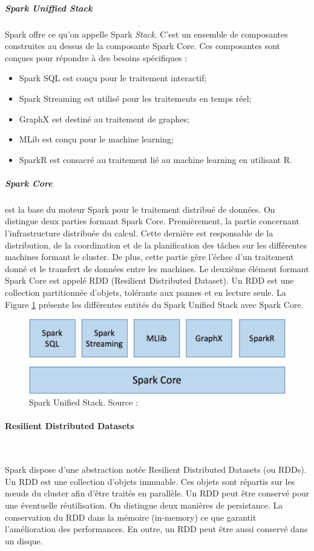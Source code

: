 \subparagraph{Spark Uniffied Stack} \label{Spark Uniffied-Stack}Spark offre ce qu'on appelle Spark \textit{Stack}. C'est un ensemble de composantes construites au dessus de la composante Spark Core.  Ces composantes sont conçues pour répondre à des besoins spécifiques :
\begin{itemize}
	\item Spark SQL  est conçu pour le traitement interactif;
	\item Spark Streaming est utilisé pour les traitements en temps réel;
	\item  GraphX est destiné au traitement de graphes;
	\item MLib est conçu pour le machine learning;
	\item SparkR est consacré au traitement lié au machine learning en utilisant  R.
\end{itemize}
\subparagraph{Spark Core} est la base du moteur Spark pour le traitement distribué de données.  On distingue deux parties formant Spark Core. Premièrement, la partie concernant l'infrastructure distribuée du calcul. Cette dernière est responsable de la distribution, de la coordination et de la planification des tâches  sur les différentes machines formant le cluster. De plus, cette partie gère l'échec d'un traitement donné et le transfert de données entre les machines. Le deuxième élément formant Spark Core est appelé RDD (Resilient Distributed Dataset). Un RDD est une collection partitionnée d'objets, tolérante aux pannes et en lecture seule. 
La Figure \ref{fig:unified-stack}  présente les différentes entités du Spark Unified Stack avec Spark Core.
\begin{figure}[H]
	\centering
	\captionsetup{justification=centering}
	\includegraphics[width=0.7\linewidth]{illustrations/unified-stack}
	\caption{ Spark Unified Stack. Source : \cite{eginning-Apache-Spark-2-unified-stack}}
	\label{fig:unified-stack}
\end{figure}

\paragraph{Resilient Distributed Datasets}~


Spark dispose d'une abstraction notée Resilient Distributed Datasets (ou RDDs). Un RDD est une collection d'objets immuable. Ces objets sont répartis sur les n\oe{}uds du cluster afin d'être traités en parallèle. Un RDD peut être conservé  pour une éventuelle réutilisation. On distingue deux manières de persistance. La conservation du RDD dans la mémoire (in-memory) ce que garantit l'amélioration des performances. En outre, un RDD peut être aussi conservé dans un disque. 

